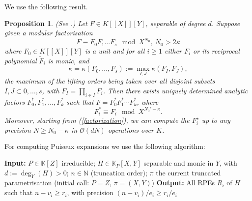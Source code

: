 \documentclass[a4paper,11pt,reqno]{amsart}%
\theoremstyle{definition}
\theoremstyle{plain}
\newtheorem{proposition}[defn]{Proposition}
\theoremstyle{remark}
\newcommand{\bigO}{\mathcal{O}}
\begin{document}
We use the following result.

\begin{proposition}\label{prop:factors}(See \cite[Proposition 23]{poteaux2021}.)
Let $F \in K[[X]][Y]$, separable of degree $d$. Suppose given a modular factorisation
\begin{equation}\label{factorization}
F \equiv  F_0 F_1 \dots F_s \mod X^{N_0}, \ N_0 > 2\kappa
\end{equation}
where $F_0 \in K[[X]][Y]$ is a unit and for all $i \ge 1$ either $F_i$ or its reciprocal polynomial $\tilde F_i$ is monic, and
$$
\kappa = \kappa(F_0,..., F_s) := \max_{I, J} \kappa(F_I, F_J),
$$
the maximum of the lifting orders being taken over all disjoint subsets $I, J \subset {0,\dots,s}$,
with $F_I = \prod_{i\in I} F_i$. Then there exists uniquely determined analytic factors $F_0^*, F_1^*,\dots, F_k^*$ such that $F = F_0^* F_1^* \cdots F_k^*$, where
$$
F_i^* \equiv F_i \mod X^{N_0'-\kappa}.
$$
Moreover, starting from (\ref{factorization}), we can compute the $F_i^\star$ up to any precision $N \ge N_0 - \kappa$ in $\bigO(dN)$ operations over $K$.
\end{proposition}

For computing Puiseux expansions we use the following algorithm:

\begin{algorithm}[H]
\caption{Half-RNP($H, P, n, \pi$)}
\begin{algorithmic}[1]
\State \textbf{Input:} $P \in \mathbb{K}[Z]$ irreducible;
$H \in \mathbb{K}_P[X, Y]$ separable and monic in $Y$, with $d := \deg_Y(H) > 0$;
$n \in \mathbb{N}$ (truncation order); $\pi$ the current truncated parametrisation (initial call: $P = Z$, $\pi = (X, Y)$)
\State \textbf{Output:} All RPEs $R_i$ of $H$ such that $n - v_i \ge r_i$, with precision $(n - v_i)/e_i \ge r_i/e_i$
\end{algorithmic}
\end{algorithm}
\end{document}
